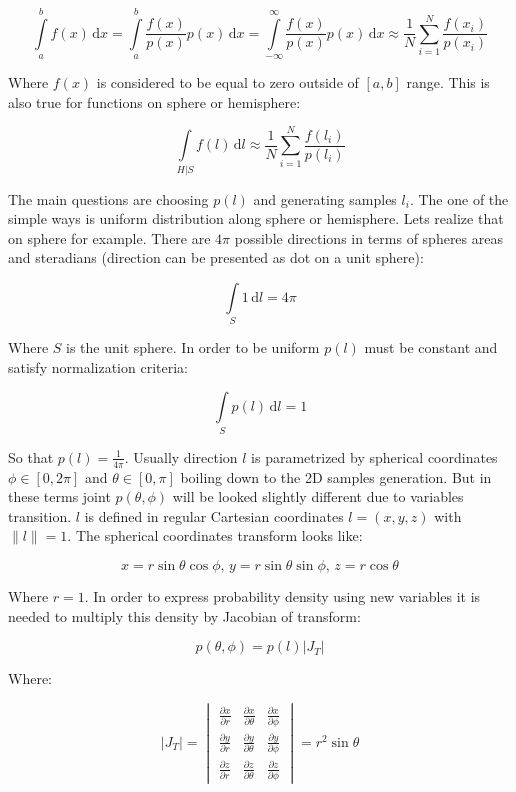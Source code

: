 \[\int\limits_a^b f(x)\, \mathrm{d}x = \int\limits_a^b \frac{f(x)}{p(x)}p(x)\, \mathrm{d}x = \int\limits_{-\infty}^{\infty} \frac{f(x)}{p(x)}p(x)\, \mathrm{d}x \approx \frac{1}{N} \sum_{i=1}^{N} \frac{f(x_i)}{p(x_i)}\]

Where $f(x)$ is considered to be equal to zero outside of $[a, b]$ range. This is also true for functions on sphere or hemisphere\+:

\[\int\limits_{H|S} f(l)\, \mathrm{d}l \approx \frac{1}{N}\sum_{i=1}^{N} \frac{f(l_i)}{p(l_i)}\]

The main questions are choosing $p(l)$ and generating samples $l_i$. The one of the simple ways is uniform distribution along sphere or hemisphere. Lets realize that on sphere for example. There are $4\pi$ possible directions in terms of sphere\textquotesingle{}s areas and steradians (direction can be presented as dot on a unit sphere)\+:

\[\int\limits_S 1\, \mathrm{d}l = 4\pi\]

Where $S$ is the unit sphere. In order to be uniform $p(l)$ must be constant and satisfy normalization criteria\+:

\[\int\limits_S p(l)\, \mathrm{d}l = 1\]

So that $p(l) = \frac{1}{4\pi}$. Usually direction $l$ is parametrized by spherical coordinates $\phi \in [0, 2\pi]$ and $\theta \in [0, \pi]$ boiling down to the 2D samples generation. But in these terms joint $p(\theta, \phi)$ will be looked slightly different due to variables transition. $l$ is defined in regular Cartesian coordinates $l=(x, y, z)$ with $\|l\| = 1$. The spherical coordinates transform looks like\+:

\[x = r\sin\theta\cos\phi,\, y = r\sin\theta\sin\phi,\, z = r\cos\theta\]

Where $r = 1$. In order to express probability density using new variables it is needed to multiply this density by Jacobian of transform\+:

\[p(\theta,\phi) = p(l)|J_T|\]

Where\+:

\[|J_T| = \begin{vmatrix} \frac{\partial x}{\partial r} & \frac{\partial x}{\partial \theta} & \frac{\partial x}{\partial \phi} \\ \frac{\partial y}{\partial r} & \frac{\partial y}{\partial \theta} & \frac{\partial y}{\partial \phi} \\ \frac{\partial z}{\partial r} & \frac{\partial z}{\partial \theta} & \frac{\partial z}{\partial \phi} \end{vmatrix} = r^2\sin\theta\]

